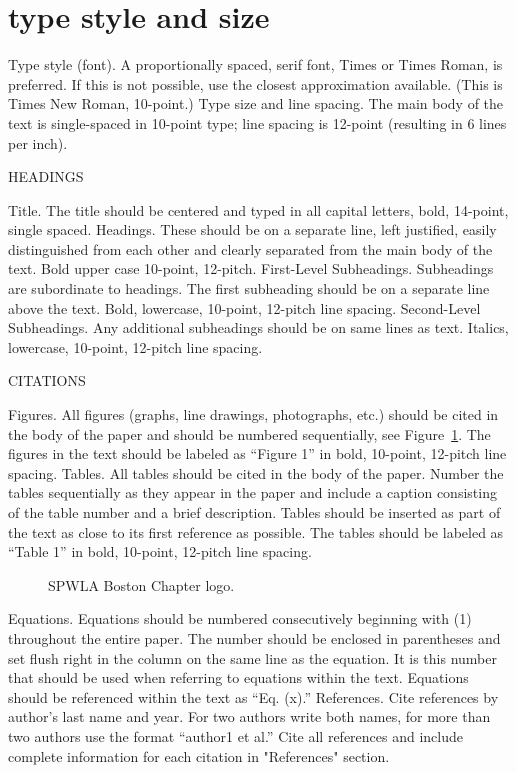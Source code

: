 \documentclass[10pt,twocolumn,twoside]{article}
\begin{document}
\section{type style and size}
Type style (font). A proportionally spaced, serif font, Times or Times Roman, is preferred. If this is not possible, use the closest approximation available. (This is Times New Roman, 10-point.)
Type size and line spacing. The main body of the text is single-spaced in 10-point type; line spacing is 12-point (resulting in 6 lines per inch).

HEADINGS

Title. The title should be centered and typed in all capital letters, bold, 14-point, single spaced.
Headings. These should be on a separate line, left justified, easily distinguished from each other and clearly separated from the main body of the text. Bold upper case 10-point, 12-pitch.
First-Level Subheadings. Subheadings are subordinate to headings. The first subheading should be on a separate line above the text. Bold, lowercase, 10-point, 12-pitch line spacing.
Second-Level Subheadings. Any additional subheadings should be on same lines as text. Italics, lowercase, 10-point, 12-pitch line spacing.

CITATIONS

Figures. All figures (graphs, line drawings, photographs, etc.) should be cited in the body of the paper and should be numbered sequentially, see Figure~\ref{fig:logo}. The figures in the text should be labeled as “Figure 1” in bold, 10-point, 12-pitch line spacing.
Tables. All tables should be cited in the body of the paper. Number the tables sequentially as they appear in the paper and include a caption consisting of the table number and a brief description. Tables should be inserted as part of the text as close to its first reference as possible. The tables should be labeled as “Table 1” in bold, 10-point, 12-pitch line spacing.

\begin{figure}
	\centering
	\caption{SPWLA Boston Chapter logo.}
	\label{fig:logo}
\end{figure}


Equations. Equations should be numbered consecutively beginning with (1) throughout the entire paper. The number should be enclosed in parentheses and set flush right in the column on the same line as the equation. It is this number that should be used when referring to equations within the text. Equations should be referenced within the text as “Eq. (x).”
References. Cite references by author’s last name and year. For two authors write both names, for more than two authors use the format “author1 et al.” Cite all references and include complete information for each citation in "References" section.
\end{document}
